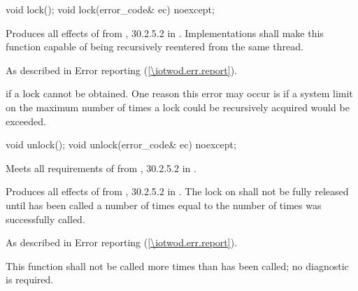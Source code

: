 \begin{itemdecl}
void lock();
void lock(error_code& ec) noexcept;
\end{itemdecl}
\begin{itemdescr}
	\pnum
	\effects
	Produces all effects of  from , 
	30.2.5.2 in \CppXIV. Implementations shall make this function capable of 
	being recursively reentered from the same thread.
	
	\pnum
	\throws
	As described in Error reporting (\ref{\iotwod.err.report}).
	
	\pnum
	\errors
	 if a lock cannot be obtained.
	\enternote
	One reason this error may occur is if a system limit on the maximum number of times a lock could be recursively acquired would be exceeded.
	\exitnote
\end{itemdescr}

\begin{itemdecl}
void unlock();
void unlock(error_code& ec) noexcept;
\end{itemdecl}
\begin{itemdescr}
	\pnum
	\requires
	Meets all requirements of  from , 
	30.2.5.2 in \CppXIV.
	
	\pnum
	\effects
	Produces all effects of  from , 
	30.2.5.2 in \CppXIV. The lock on  shall not be fully released 
	until  has been called a number of times equal to the 
	number of times  was successfully called.
	
	\pnum
	\throws
	As described in Error reporting (\ref{\iotwod.err.report}).
	
	\pnum
	\remarks
	This function shall not be called more times than  has been called; no diagnostic is required.

\end{itemdescr}
